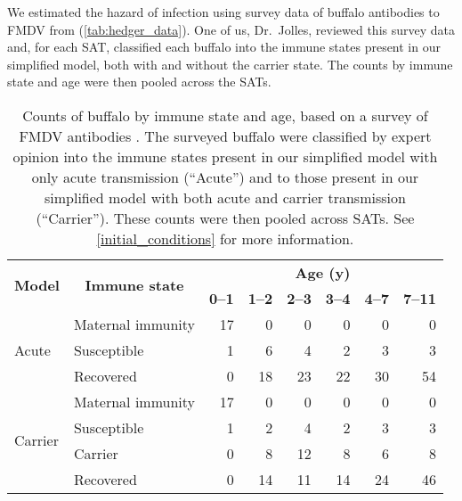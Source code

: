 \documentclass[12pt, UKenglish]{article}  %
\begin{document}
We estimated the hazard of infection using survey data of buffalo
antibodies to FMDV from \citeauthor{hedger_1972} \autocite{hedger_1972}
(\autoref{tab:hedger_data}). One of us, Dr.~Jolles, reviewed this
survey data and, for each SAT, classified each buffalo into the immune
states present in our simplified model, both with and without the
carrier state. The counts by immune state and age were then pooled
across the SATs.

\begin{table}
  \centering
  \begin{tabular}{|l|l|rrrrrr|}
    \hline
    \multicolumn{1}{|c}{\multirow{2}{*}{\textbf{Model}}}
    & \multicolumn{1}{|c}{\multirow{2}{*}{\textbf{Immune state}}}
    & \multicolumn{6}{|c|}{\textbf{Age (y)}} \\
    & & \multicolumn{1}{|c}{\textbf{0--1}}
    & \multicolumn{1}{c}{\textbf{1--2}}
    & \multicolumn{1}{c}{\textbf{2--3}}
    & \multicolumn{1}{c}{\textbf{3--4}}
    & \multicolumn{1}{c}{\textbf{4--7}}
    & \multicolumn{1}{c|}{\textbf{7--11}} \\
    \hline
    \multirow{3}{*}{Acute}
    & Maternal immunity & 17 & 0 & 0 & 0 & 0 & 0 \\
    & Susceptible & 1 & 6 & 4 & 2 & 3 & 3 \\
    & Recovered & 0 & 18 & 23 & 22 & 30 & 54 \\
    \hline
    \multirow{4}{*}{Carrier}
    & Maternal immunity & 17 & 0 & 0 & 0 & 0 & 0 \\
    & Susceptible & 1 & 2 & 4 & 2 & 3 & 3 \\
    & Carrier & 0 & 8 & 12 & 8 & 6 & 8 \\
    & Recovered & 0 & 14 & 11 & 14 & 24 & 46 \\
    \hline
  \end{tabular}
  \caption{Counts of buffalo by immune state and age, based on a
    survey of FMDV antibodies \autocite{hedger_1972}.  The surveyed
    buffalo were classified by expert opinion into the immune states
    present in our simplified model with only acute transmission
    (\enquote{Acute}) and to those present in our simplified model
    with both acute and carrier transmission
    (\enquote{Carrier}). These counts were then pooled across
    SATs. See \autoref{initial_conditions} for more information.}
  \label{tab:hedger_data}
\end{table}
\end{document}
